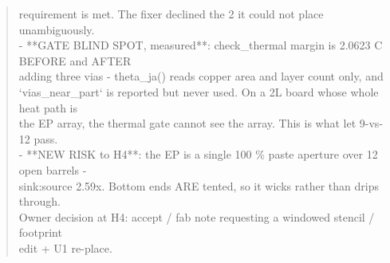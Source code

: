 \documentclass[11pt,a4paper]{article}
\begin{document}
\begin{quote}
  requirement is met. The fixer declined the 2 it could not place unambiguously.\\
- {*}{*}GATE BLIND SPOT, measured{*}{*}: check\_thermal margin is 2.0623 C BEFORE and AFTER\\
  adding three vias - theta\_ja() reads copper area and layer count only, and\\
  `vias\_near\_part` is reported but never used. On a 2L board whose whole heat path is\\
  the EP array, the thermal gate cannot see the array. This is what let 9-vs-12 pass.\\
- {*}{*}NEW RISK to H4{*}{*}: the EP is a single 100 \% paste aperture over 12 open barrels -\\
  sink:source 2.59x. Bottom ends ARE tented, so it wicks rather than drips through.\\
  Owner decision at H4: accept / fab note requesting a windowed stencil / footprint\\
  edit + U1 re-place.
\end{quote}
\end{document}
